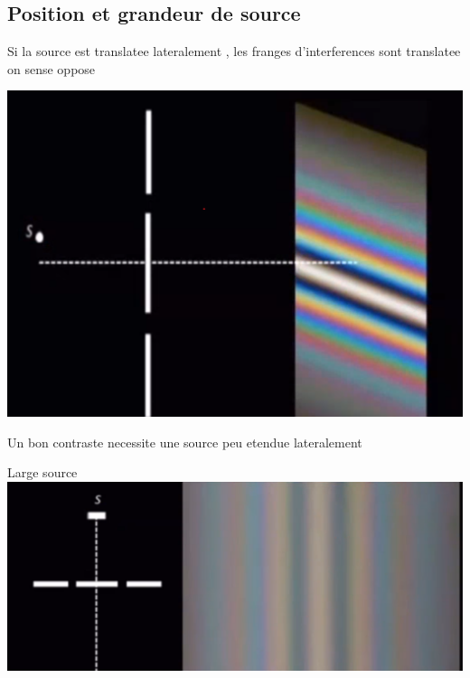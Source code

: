 \documentclass[12pt]{book}
\begin{document}
            \subsection{Position et grandeur de source}
                \begin{minipage}{0.6\linewidth}
                   Si la source est translatee lateralement , les franges d'interferences sont translatee on sense oppose
                \end{minipage}
                \begin{minipage}{0.4\linewidth}
                    \includegraphics[width=\linewidth]{pic/sposition.png}
                \end{minipage} 
                \pagebreak
                Un bon contraste necessite une source peu etendue lateralement \\
                    \begin{minipage}{0.45\linewidth}
                        Large source\\
                        \includegraphics[width=\linewidth]{pic/ssize1.png}
                    \end{minipage}
\end{document}

